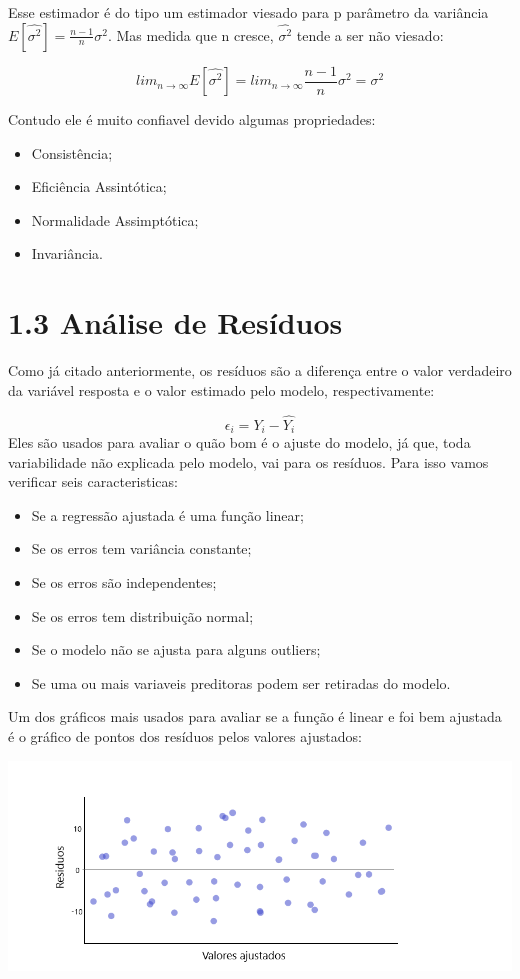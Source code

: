 \documentclass[
]{article}
\providecommand{\tightlist}{%
  \setlength{\itemsep}{0pt}\setlength{\parskip}{0pt}}
\begin{document}
Esse estimador é do tipo um estimador viesado para p parâmetro da
variância \(E[\hat{\sigma^2}]=\frac{n-1}{n}\sigma^2\). Mas medida que n
cresce, \(\hat{\sigma^2}\) tende a ser não viesado:

\[lim_{n \to \infty }E[\hat{\sigma^2}]=lim_{n \to \infty} \frac{n-1}{n}\sigma^2=\sigma^2\]

Contudo ele é muito confiavel devido algumas propriedades:

\begin{itemize}
\tightlist
\item
  Consistência;
\item
  Eficiência Assintótica;
\item
  Normalidade Assimptótica;
\item
  Invariância.
\end{itemize}

\hypertarget{anuxe1lise-de-resuxedduos}{%
\section{1.3 Análise de Resíduos}\label{anuxe1lise-de-resuxedduos}}

Como já citado anteriormente, os resíduos são a diferença entre o valor
verdadeiro da variável resposta e o valor estimado pelo modelo,
respectivamente:

\[\epsilon_i=Y_i-\hat{Y_i}\] Eles são usados para avaliar o quão bom é o
ajuste do modelo, já que, toda variabilidade não explicada pelo modelo,
vai para os resíduos. Para isso vamos verificar seis caracteristicas:

\begin{itemize}
\tightlist
\item
  Se a regressão ajustada é uma função linear;
\item
  Se os erros tem variância constante;
\item
  Se os erros são independentes;
\item
  Se os erros tem distribuição normal;
\item
  Se o modelo não se ajusta para alguns outliers;
\item
  Se uma ou mais variaveis preditoras podem ser retiradas do modelo.
\end{itemize}

Um dos gráficos mais usados para avaliar se a função é linear e foi bem
ajustada é o gráfico de pontos dos resíduos pelos valores ajustados:

\includegraphics{images/residuos1.png}
\end{document}
